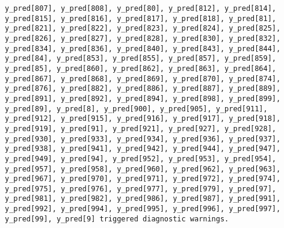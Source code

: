\documentclass[
  letterpaper,
  DIV=11,
  numbers=noendperiod]{scrartcl}
\begin{document}
\begin{verbatim}
y_pred[807], y_pred[808], y_pred[80], y_pred[812], y_pred[814],
y_pred[815], y_pred[816], y_pred[817], y_pred[818], y_pred[81],
y_pred[821], y_pred[822], y_pred[823], y_pred[824], y_pred[825],
y_pred[826], y_pred[827], y_pred[828], y_pred[830], y_pred[832],
y_pred[834], y_pred[836], y_pred[840], y_pred[843], y_pred[844],
y_pred[84], y_pred[853], y_pred[855], y_pred[857], y_pred[859],
y_pred[85], y_pred[860], y_pred[862], y_pred[863], y_pred[864],
y_pred[867], y_pred[868], y_pred[869], y_pred[870], y_pred[874],
y_pred[876], y_pred[882], y_pred[886], y_pred[887], y_pred[889],
y_pred[891], y_pred[892], y_pred[894], y_pred[898], y_pred[899],
y_pred[89], y_pred[8], y_pred[900], y_pred[905], y_pred[911],
y_pred[912], y_pred[915], y_pred[916], y_pred[917], y_pred[918],
y_pred[919], y_pred[91], y_pred[921], y_pred[927], y_pred[928],
y_pred[930], y_pred[933], y_pred[934], y_pred[936], y_pred[937],
y_pred[938], y_pred[941], y_pred[942], y_pred[944], y_pred[947],
y_pred[949], y_pred[94], y_pred[952], y_pred[953], y_pred[954],
y_pred[957], y_pred[958], y_pred[960], y_pred[962], y_pred[963],
y_pred[967], y_pred[970], y_pred[971], y_pred[972], y_pred[974],
y_pred[975], y_pred[976], y_pred[977], y_pred[979], y_pred[97],
y_pred[981], y_pred[982], y_pred[986], y_pred[987], y_pred[991],
y_pred[992], y_pred[994], y_pred[995], y_pred[996], y_pred[997],
y_pred[99], y_pred[9] triggered diagnostic warnings.
 

\end{verbatim}
\end{document}
